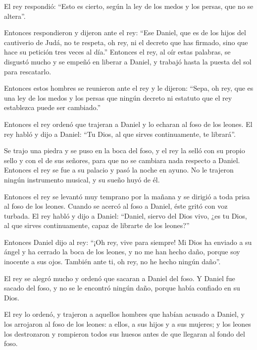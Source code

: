 El rey respondió: ``Esto es cierto, según la ley de los medos y los
persas, que no se altera''.

 Entonces respondieron y dijeron ante el rey: ``Ese
Daniel, que es de los hijos del cautiverio de Judá, no te respeta, oh
rey, ni el decreto que has firmado, sino que hace su petición tres veces
al día.''  Entonces el rey, al oír estas palabras, se
disgustó mucho y se empeñó en liberar a Daniel, y trabajó hasta la
puesta del sol para rescatarlo.

 Entonces estos hombres se reunieron ante el rey y le
dijeron: ``Sepa, oh rey, que es una ley de los medos y los persas que
ningún decreto ni estatuto que el rey establezca puede ser cambiado.''

 Entonces el rey ordenó que trajeran a Daniel y lo
echaran al foso de los leones. El rey habló y dijo a Daniel: ``Tu Dios,
al que sirves continuamente, te librará''.

 Se trajo una piedra y se puso en la boca del foso, y el
rey la selló con su propio sello y con el de sus señores, para que no se
cambiara nada respecto a Daniel.  Entonces el rey se fue
a su palacio y pasó la noche en ayuno. No le trajeron ningún instrumento
musical, y su sueño huyó de él.

 Entonces el rey se levantó muy temprano por la mañana y
se dirigió a toda prisa al foso de los leones.  Cuando se
acercó al foso a Daniel, éste gritó con voz turbada. El rey habló y dijo
a Daniel: ``Daniel, siervo del Dios vivo, ¿es tu Dios, al que sirves
continuamente, capaz de librarte de los leones?''

 Entonces Daniel dijo al rey: ``¡Oh rey, vive para
siempre!  Mi Dios ha enviado a su ángel y ha cerrado la
boca de los leones, y no me han hecho daño, porque soy inocente a sus
ojos. También ante ti, oh rey, no he hecho ningún daño''.

 El rey se alegró mucho y ordenó que sacaran a Daniel del
foso. Y Daniel fue sacado del foso, y no se le encontró ningún daño,
porque había confiado en su Dios.

 El rey lo ordenó, y trajeron a aquellos hombres que
habían acusado a Daniel, y los arrojaron al foso de los leones: a ellos,
a sus hijos y a sus mujeres; y los leones los destrozaron y rompieron
todos sus huesos antes de que llegaran al fondo del foso.

